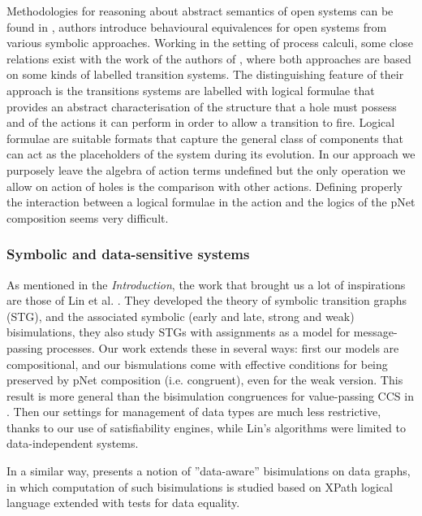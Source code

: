 \documentclass{lmcs}
\begin{document}
Methodologies for reasoning about abstract semantics of open systems can be found in \cite{BaldanBB:2002, BaldanBB:07,Dubut:20}, authors introduce  behavioural equivalences for open systems from various symbolic approaches. Working in the setting of process calculi, some close relations  exist with the work  of the authors of \cite{BaldanBB:2002,BaldanBB:07}, where both approaches are based
on some kinds of labelled transition systems. The distinguishing feature of their approach is the transitions systems are labelled with logical formulae that provides  an abstract characterisation of the structure that a hole must possess and of the actions it can perform in order to allow a transition to fire. Logical formulae are suitable formats that capture the general class of components that can act as the placeholders of the system during its evolution. In our approach we purposely leave the algebra of action terms undefined but the only operation we allow on action of holes is the comparison with other actions. Defining properly the interaction between a logical formulae in the action and the logics of the pNet composition seems very difficult.

\subsubsection*{Symbolic and data-sensitive systems}
 As mentioned in the \emph{Introduction}, the work that brought us a lot of inspirations are those of Lin et al. \cite{IngolfsdottirL:2001,HennessyLin:TCS95,Linconcur96}. They developed the theory of symbolic transition graphs (STG), and the associated symbolic (early and late, strong and weak) bisimulations, they also study STGs with assignments as a model for message-passing processes. Our work extends these in several ways: first our models are compositional, and our bismulations come with effective conditions for being preserved by pNet composition (i.e. congruent), even for the weak version. This result is more general than the bisimulation congruences for value-passing CCS in \cite{IngolfsdottirL:2001}. Then our settings for management of data types are much less restrictive, thanks to our use of satisfiability engines, while Lin's algorithms were limited to data-independent systems. 

In a similar way, \cite{Abriola:2018} presents a notion of ''data-aware'' bisimulations on data graphs, in which computation of such bisimulations is studied based on XPath logical language extended with tests for data equality.
\end{document}
